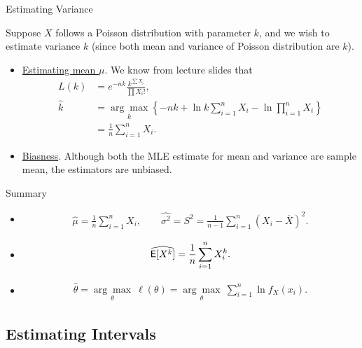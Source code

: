 \begin{frame}{Estimating Variance}

\justifying
{} Suppose $X$ follows a Poisson distribution with parameter $k$, and we wish to estimate variance $k$ (since both mean and variance of Poisson distribution are $k$).
\begin{itemize}
	\justifying
	\item \underline{Estimating mean $\mu$}. We know from lecture slides that
	\footnotesize
	\begin{align*}
	L(k) & = e^{-nk} \frac{k^{\sum X_i}}{\prod X_i!}, \\
	\widehat{k} & = \underset{k}{\arg\max}\left\{-nk + \ln k\sum_{i=1}^n X_i - \ln\prod_{i=1}^n X_i \right\} \\
	& = \frac{1}{n}\sum_{i=1}^n X_i.
	\end{align*}
	\normalsize
	\item \underline{Biasness}. Although both the MLE estimate for mean and variance are sample mean, the estimators are unbiased.
\end{itemize}

\end{frame}

\begin{frame}{Summary}

\begin{itemize}
	\justifying
	\item {} 
	\begin{align*}
	\widehat{\mu} = \frac{1}{n}\sum_{i=1}^n X_i, \qquad \widehat{\sigma^2} = S^2 = \frac{1}{n-1}\sum_{i=1}^n (X_i - \overline{X})^2.
	\end{align*}
	\item {}
	\begin{align*}
	\widehat{\mathsf{E}[X^k]} = \frac{1}{n}\sum_{i=1}^n X_i^k.
	\end{align*}
	\item {}
	\begin{align*}
	\widehat{\theta} = \underset{\theta}{\arg\max}\ \ell(\theta) = \underset{\theta}{\arg\max}\ \sum_{i=1}^n \ln f_{X}(x_i).
	\end{align*}
\end{itemize}


\end{frame}


\subsection{Estimating Intervals}

